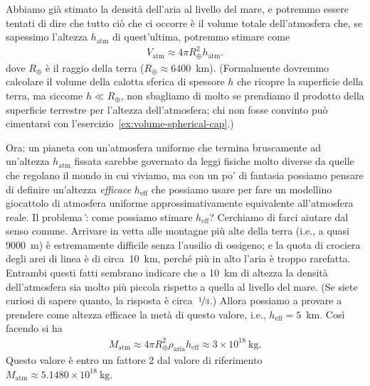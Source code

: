 \begin{solution}

Abbiamo gi\`a stimato la densit\`a dell'aria al livello del mare, e potremmo
essere tentati di dire che tutto ci\`o che ci occorre \`e il volume totale
dell'atmosfera che, se sapessimo l'altezza $h_\text{atm}$ di quest'ultima, potremmo
stimare come
\begin{align*}
  V_\text{atm} \approx 4 \pi R_\oplus^2 h_\text{atm}.
\end{align*}
dove $R_\oplus$ \`e il raggio della terra ($R_\oplus \approx 6400$~km).
(Formalmente dovremmo calcolare il volume della calotta sferica di spessore $h$
che ricopre la superficie della terra, ma siccome $h \ll R_\oplus$, non sbagliamo
di molto se prendiamo il prodotto della superficie terrestre per l'altezza
dell'atmosfera; chi non fosse convinto pu\`o cimentarsi con
l'esercizio~\ref{ex:volume-spherical-cap}.)

Ora: un pianeta con un'atmosfera uniforme che termina bruscamente ad un'altezza
$h_\text{atm}$ fissata sarebbe governato da leggi fisiche molto diverse da quelle
che regolano il mondo in cui viviamo, ma con un po' di fantasia possiamo pensare
di definire un'altezza \emph{efficace} $h_\text{eff}$ che possiamo usare per fare
un modellino giocattolo di atmosfera uniforme approssimativamente equivalente
all'atmosfera reale. Il problema \`: come possiamo stimare $h_\text{eff}$?
Cerchiamo di farci aiutare dal senso comune. Arrivare in vetta alle montagne
pi\`u alte della terra (i.e., a quasi 9000~m) \`e estremamente difficile senza
l'ausilio di ossigeno; e la quota di crociera degli arei di linea \`e di
circa~10~km, perch\'e pi\`u in alto l'aria \`e troppo rarefatta. Entrambi questi
fatti sembrano indicare che a 10~km di altezza la densit\`a dell'atmosfera sia
molto pi\`u piccola rispetto a quella al livello del mare. (Se siete curiosi di
sapere quanto, la risposta \`e circa~$\nicefrac{1}{3}$.) Allora possiamo a provare
a prendere come altezza efficace la met\`a di questo valore, i.e.,
$h_\text{eff} = 5$~km. Cos\`i facendo si ha
\begin{align}
  M_\text{atm} \approx 4 \pi R_\oplus^2 \rho_\text{aria} h_\text{eff}
  \approx 3 \times 10^{18}~\text{kg}.
\end{align}
Questo valore \`e entro un fattore 2 dal valore di riferimento
$M_\text{atm} \approx 5.1480 \times 10^{18}~\text{kg}$.


\end{solution}
